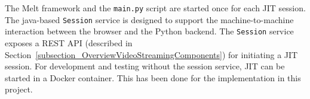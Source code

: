 \documentclass[../MasterThesis.tex]{subfiles}
\begin{document}
The Melt framework and the \texttt{main.py} script are started once for each JIT session.
The java-based \texttt{Session} service is designed to support the machine-to-machine interaction between the browser and the Python backend. 
The \texttt{Session} service exposes a REST API (described in Section~\ref{subsection_OverviewVideoStreamingComponents}) for initiating a JIT session. 
%
%
%
%
%
%
%
%
%
For development and testing without the session service, JIT can be started in a Docker container. This has been done for the implementation in this project.


\end{document}
